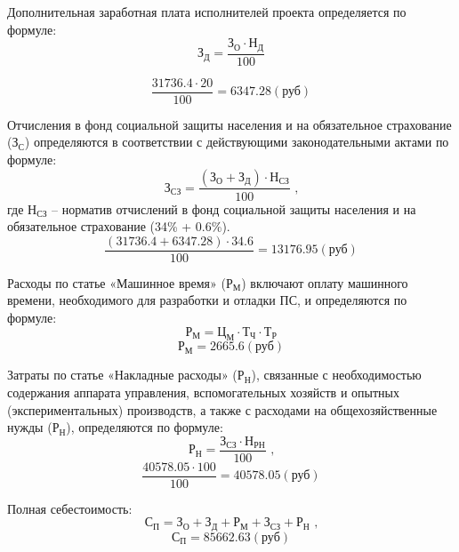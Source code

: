 Дополнительная заработная плата исполнителей проекта определяется по формуле:
\begin{equation}
\label{formula:economics:cost:f_add_zp}
{\text{З}}_{\text{Д}} = \frac{ {\text{З}}_{\text{О}} \cdot {\text{Н}}_{\text{Д}} }{ 100 }
\end{equation}

$$\frac{ 31736.4 \cdot 20 }{ 100 } = 6347.28 (\text{руб})$$

Отчисления в фонд социальной защиты населения и на обязательное страхование (${\text{З}}_{\text{С}}$) определяются в соответствии с действующими законодательными актами по формуле:
\begin{equation}
\label{formula:economics:cost:f_fszn}
{\text{З}}_{\text{СЗ}} = \frac{ ({\text{З}}_{\text{О}} + {\text{З}}_{\text{Д}}) \cdot {\text{Н}}_{\text{СЗ}} }{ 100 }
\text{ ,}
\end{equation}
где ${\text{Н}}_{\text{СЗ}}$ -- норматив отчислений в фонд социальной защиты населения и на обязательное страхование (34\% + 0.6\%).
$$\frac{ (31736.4 + 6347.28) \cdot 34.6 }{ 100 } = 13176.95 (\text{руб})$$

Расходы по статье «Машинное время» (${\text{Р}}_{\text{М}}$) включают оплату машинного времени, необходимого для разработки и отладки ПС, и определяются по формуле:
\begin{equation}
\label{formula:economics:cost:f_mt}
{\text{Р}}_{\text{М}} = {\text{Ц}}_{\text{М}} \cdot {\text{Т}}_{\text{Ч}} \cdot {\text{Т}}_{\text{Р}}
\end{equation}
$${\text{Р}}_{\text{М}} = 2665.6 (\text{руб})$$

Затраты по статье «Накладные расходы» (${\text{Р}}_{\text{Н}}$), связанные с необходимостью содержания аппарата управления, вспомогательных хозяйств и опытных (экспериментальных) производств, а также с расходами на общехозяйственные нужды (${\text{Р}}_{\text{Н}}$), определяются по формуле:
\begin{equation}
\label{formula:economics:cost:f_nr}
{\text{Р}}_{\text{Н}} = \frac{ {\text{З}}_{\text{СЗ}} \cdot {\text{Н}}_{\text{РН}} }{ 100 } \text{ ,}
\end{equation}
$$\frac{ 40578.05 \cdot 100  }{ 100 } = 40578.05 (\text{руб})$$

Полная себестоимость:
\begin{equation}
\label{formula:economics:cost:f_psb}
{\text{С}}_{\text{П}} = {\text{З}}_{\text{О}} + {\text{З}}_{\text{Д}} + {\text{Р}}_{\text{М}} + {\text{З}}_{\text{СЗ}} + {\text{Р}}_{\text{Н}} \text{ ,}
\end{equation}
$${\text{С}}_{\text{П}} = 85662.63 (\text{руб})$$

